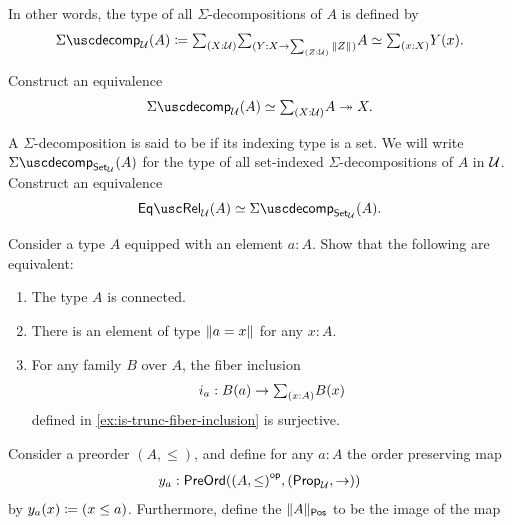 \begin{exercises}
  In other words, the type of all $\Sigma$-decompositions of $A$ is defined by
  \begin{equation*}
    \Sigmadecomposition_\UU(A) \defeq \sm{X:\UU}\sm{Y:X\to\sm{Z:\UU}\brck{Z}}A\simeq\sm{x:X}Y(x).
  \end{equation*}
  \begin{subexenum}
  \item Construct an equivalence
    \begin{equation*}
      \Sigmadecomposition_\UU(A)\simeq \sm{X:\UU}A\twoheadrightarrow X.
    \end{equation*}
  \item A $\Sigma$-decomposition is said to be  if its indexing type is a set. We will write $\Sigmadecomposition_{\Set_\UU}(A)$ for the type of all set-indexed $\Sigma$-decompositions of $A$ in $\mathcal{U}$. Construct an equivalence
    \begin{equation*}
      \eqrel_\UU(A)\simeq \Sigmadecomposition_{\Set_\UU}(A).
    \end{equation*}
  \end{subexenum}
  \exitem \label{ex:is-surjective-fiber-inclusion}Consider a type $A$ equipped with an element $a:A$. Show that the following are equivalent:
  \begin{enumerate}
  \item The type $A$ is connected.
  \item There is an element of type $\Vert a=x\Vert_{}$ for any $x:A$.
  \item For any family $B$ over $A$, the fiber inclusion
    \begin{equation*}
      i_a:B(a)\to\sm{x:A}B(x)
    \end{equation*}
    defined in \cref{ex:is-trunc-fiber-inclusion} is surjective.
  \end{enumerate}
  \exitem \label{ex:poset-reflection}Consider a preorder $(A,\leq)$, and define for any $a:A$ the order preserving map
  \begin{equation*}
    y_a : \mathsf{PreOrd}({{(A,\leq)}^\mathsf{op}},{(\mathsf{Prop}_{\mathcal{U}},{\to})})
  \end{equation*}
  by $y_a(x)\coloneqq(x\leq a)$. Furthermore, define the  $\Vert A\Vert_{\mathsf{Pos}}$ to be the image of the map

\end{exercises}
